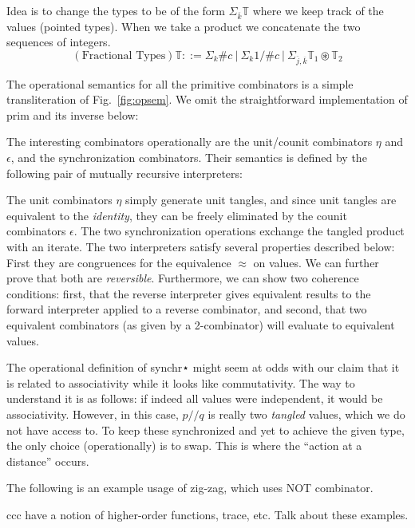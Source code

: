 \documentclass[a4paper,USenglish]{lipics-v2016-utf8x}
\newcommand{\hash}{\#}
\newcommand{\alt}{~|~}
\newcommand{\order}[1]{\hash #1}
\newcommand{\iorder}[1]{1/\hash #1}
\begin{document}
Idea is to change the types to be of the form $\Sigma_{\overline{k}}\mathbb{T}$
where we keep track of the values (pointed types). When we take a product we
concatenate the two sequences of integers.
\[
(\textrm{Fractional Types})  \mathbb{T} ::=
  \Sigma_k\order{c} \alt \Sigma_k\iorder{c} \alt
  \Sigma_{\overline{j},\overline{k}}\mathbb{T}_1 \circledast \mathbb{T}_2
\]

The operational semantics for all the primitive combinators is a
simple transliteration of Fig.~\ref{fig:opsem}. We omit the
straightforward implementation of prim and its inverse
below:

The interesting combinators operationally are the unit/counit combinators $\eta$
and $\epsilon$, and the synchronization combinators. Their semantics is defined
by the following pair of mutually recursive interpreters:

The unit combinators $\eta$ simply generate unit tangles, and since unit tangles
are equivalent to the \emph{identity}, they can be freely eliminated by the
counit combinators $\epsilon$. The two synchronization operations exchange the
tangled product with an iterate. The two interpreters satisfy several properties
described below: First they are congruences for the equivalence $≈$ on values.
We can further prove that both are \emph{reversible}.  Furthermore, we can show
two coherence conditions: first, that the reverse interpreter gives equivalent
results to the forward interpreter applied to a reverse combinator, and second,
that two equivalent combinators (as given by a 2-combinator) will evaluate to
equivalent values.

The operational definition of synchr⋆ might seem at odds with our claim that it is related to associativity while it looks like commutativity.  The way to understand it is as follows: if indeed all values were independent, it would be associativity.  However, in this case, $p // q$ is really two \emph{tangled} values, which we do not have access to.  To keep these synchronized and yet to achieve the given type, the only choice (operationally) is to swap.  This is where the ``action at a distance'' occurs.


The following is an example usage of zig-zag, which uses NOT combinator.

ccc have a notion of higher-order functions, trace, etc. Talk about these examples.
\end{document}
